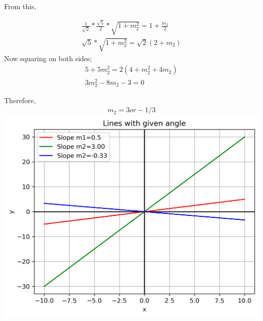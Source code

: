 \documentclass[journal]{IEEEtran}
\begin{document}
From this,

\begin{align}
    \frac{1}{\sqrt{2}}*\frac{\sqrt{5}}{2}*\sqrt{1+m_2^2}=1+\frac{m_2}{2}\\
    \sqrt{5}*\sqrt{1+m_2^2}=\sqrt{2}(2+m_2)
\end{align}
 Now squaring on both sides;
\begin{align}
    5+5m_2^2=2(4+m_2^2+4m_2)\\
    3m_2^2-8m_2-3=0
\end{align}

Therefore,
\begin{align}
    m_2=3or-1/3
\end{align}
 \centering
    \includegraphics[width=\columnwidth, height=0.8\textheight, keepaspectratio]{figs/Figure_1.png}
\end{document}
